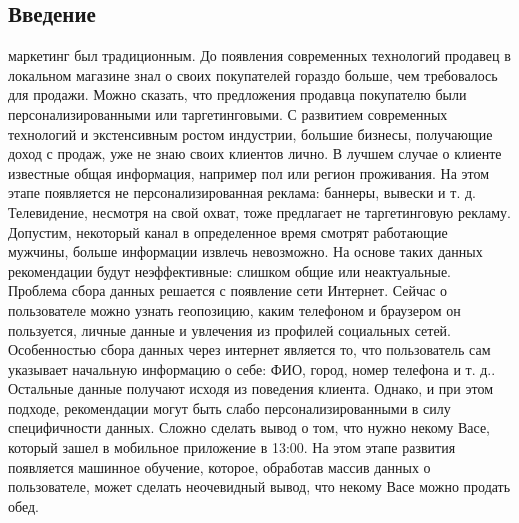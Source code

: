 \documentclass{article}
\newcommand\tab[1][1cm]{\hspace*{#1}}
\begin{document}
\newpage
	
\renewcommand*\contentsname{Содержание}
\makeatletter
\renewcommand{\l@section}{\@dottedtocline{1}{0em}{2em}}
\renewcommand{\l@subsection}{\@dottedtocline{1}{0em}{2.6em}}
\renewcommand{\l@subsubsection}{\@dottedtocline{1}{0em}{3.2em}}

\makeatother
\setcounter{page}{2}

\begin{center}
	\tableofcontents
\end{center}

\newpage
{}
\begin{center}
	\section*{Введение\vspace{5mm}}
\end{center}
 маркетинг был традиционным. До появления современных технологий продавец в локальном магазине знал о своих покупателей гораздо больше, чем требовалось для продажи. Можно сказать, что предложения продавца покупателю были персонализированными или таргетинговыми. 
С развитием современных технологий и экстенсивным ростом индустрии, большие бизнесы, получающие доход с продаж, уже не знаю своих клиентов лично. В лучшем случае о клиенте известные общая информация, например пол или регион проживания. На этом этапе появляется не персонализированная реклама: баннеры, вывески и т. д. Телевидение, несмотря на свой охват, тоже предлагает не таргетинговую рекламу. Допустим, некоторый канал в определенное время смотрят работающие мужчины, больше информации извлечь невозможно. На основе таких данных рекомендации будут неэффективные: слишком общие или неактуальные. Проблема сбора данных решается с появление сети Интернет. Сейчас о пользователе можно узнать геопозицию, каким телефоном и браузером он пользуется, личные данные и увлечения из профилей социальных сетей. Особенностью сбора данных через интернет является то, что пользователь сам указывает начальную информацию о себе: ФИО, город, номер телефона и т. д.. Остальные данные получают исходя из поведения клиента. 
Однако, и при этом подходе, рекомендации могут быть слабо персонализированными в силу специфичности данных. Сложно сделать вывод о том, что нужно некому Васе, который зашел в мобильное приложение в 13:00. На этом этапе развития появляется машинное обучение, которое, обработав массив данных о пользователе, может сделать неочевидный вывод, что некому Васе можно продать обед.\\
\end{document}
